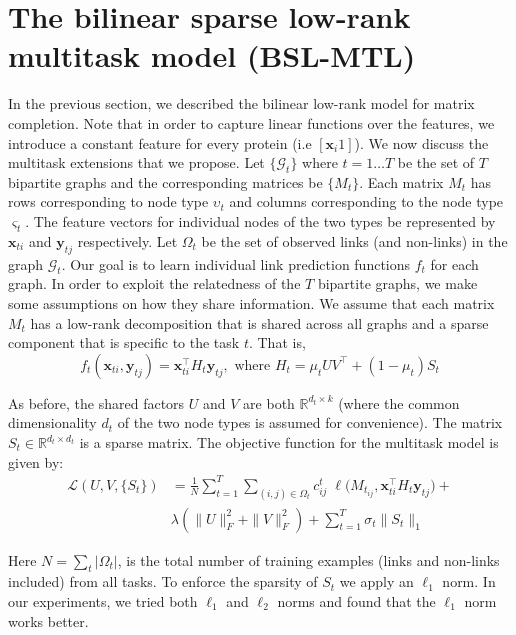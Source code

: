 \documentclass{bioinfo}
\begin{document}
\section{The bilinear sparse low-rank multitask model (BSL-MTL)} 
\label{ourmodel}
In the previous section, we described the bilinear low-rank model for matrix completion. 
Note that in order to capture linear functions over the features, we introduce a constant feature for every protein 
(i.e $[\mathbf{x}_i 1]$). We now discuss the multitask extensions that we propose. Let $\{\mathcal{G}_t\}$ where $t=1 \ldots T$ be the set of $T$ bipartite graphs and the corresponding matrices be $\{M_t\}$. Each matrix $M_t$ has rows corresponding to node type $\upsilon_t$ and columns corresponding to the node type $\varsigma_t$. The feature vectors for individual nodes of the two types be represented by $\mathbf{x}_{ti}$ and $\mathbf{y}_{tj}$ respectively. Let $\Omega_t$ be the set of observed links (and non-links) in the graph $\mathcal{G}_t$. Our goal is to learn individual link prediction functions $f_t$ for each graph. In order to exploit the relatedness of the $T$ bipartite graphs, we make some assumptions on how they share information. We assume that each matrix $M_t$ has a low-rank decomposition that is shared across all graphs and a sparse component that is specific to the task $t$. That is,
\begin{equation}
f_t(\mathbf{x}_{ti}, \mathbf{y}_{tj}) = \mathbf{x}_{ti}^\intercal H_t \mathbf{y}_{tj}, \textrm{ where } H_t = \mu_t U V^\intercal + (1-\mu_t)  S_t
\end{equation}

As before, the shared factors $U$ and $V$ are both $\mathbb{R}^{d_t \times k}$ (where the common dimensionality $d_t$ of the two node types is assumed for convenience). The matrix $S_t \in \mathbb{R}^{d_t \times d_t}$ is a sparse matrix. The objective function for the multitask model is given by:
\begin{equation}
\label{mtl_objective}
\begin{array}{ll}
\mathcal{L}(U,V,\{S_t\}) & = \displaystyle{ \frac{1}{N} \sum_{t=1}^T \sum_{(i,j) \in \Omega_t}} c^t_{ij} \; \ell \big( M_{t_{ij}}, \mathbf{x}_{ti}^\intercal H_t \mathbf{y}_{tj} \big) + \\
& \lambda ( \|U\|^2_F + \|V\|^2_F ) + \displaystyle{\sum_{t=1}^T \sigma_t \|S_t\|_1} 
\end{array}
\end{equation}

Here $N = \sum_t | \Omega_t |$, is the total number of training examples (links and non-links included) from all tasks. To enforce the sparsity of $S_t$ we apply an $\ell_1$ norm. In our experiments, we tried both $\ell_1$ and $\ell_2$ norms and found that the $\ell_1$ norm works better.
\end{document}
